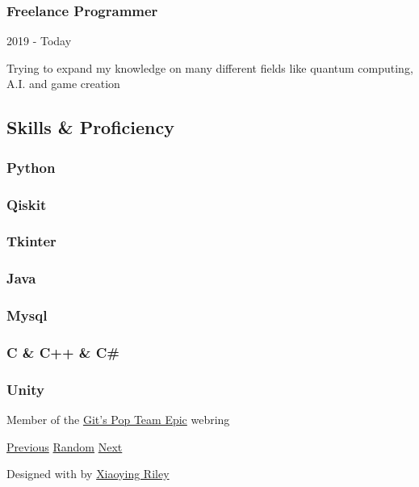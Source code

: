 \documentclass[english,]{article}
\begin{document}
\hypertarget{freelance-programmer}{%
\subsubsection{Freelance Programmer}\label{freelance-programmer}}

2019 - Today

Trying to expand my knowledge on many different fields like quantum
computing, A.I. and game creation

\hypertarget{skills-proficiency}{%
\subsection{\texorpdfstring{{ \emph{} \emph{} } Skills \&
Proficiency}{    Skills \& Proficiency}}\label{skills-proficiency}}

\hypertarget{python}{%
\subsubsection{Python}\label{python}}

\hypertarget{qiskit}{%
\subsubsection{Qiskit}\label{qiskit}}

\hypertarget{tkinter}{%
\subsubsection{Tkinter}\label{tkinter}}

\hypertarget{java}{%
\subsubsection{Java}\label{java}}

\hypertarget{mysql}{%
\subsubsection{Mysql}\label{mysql}}

\hypertarget{c-c-c}{%
\subsubsection{C \& C++ \& C\#}\label{c-c-c}}

\hypertarget{unity}{%
\subsubsection{Unity}\label{unity}}

Member of the \href{https://git-team-epic-webring.netlify.app/}{Git's
Pop Team Epic} webring

\href{https://git-team-epic-webring.netlify.app//prev}{Previous}
\href{https://git-team-epic-webring.netlify.app//random}{Random}
\href{https://git-team-epic-webring.netlify.app//next}{Next}

{Designed with \emph{} by \href{http://themes.3rdwavemedia.com}{Xiaoying
Riley}}
\end{document}
